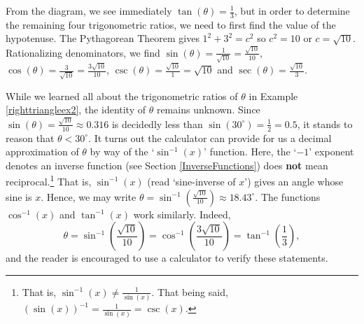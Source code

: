 \documentclass{ximera}
\begin{document}
\begin{example}
\begin{explanation}
\begin{image}
\end{image}

From the diagram, we see immediately $\tan(\theta) = \frac{1}{3}$, but in order to determine the remaining four trigonometric ratios, we need to first find the value of the hypotenuse. The Pythagorean Theorem gives $1^2 + 3^2 = c^2$ so $c^2 = 10$ or $c = \sqrt{10}$.   Rationalizing denominators, we find $\sin(\theta) = \frac{1}{\sqrt{10}} = \frac{\sqrt{10}}{10}$, $\cos(\theta) = \frac{3}{\sqrt{10}} = \frac{3\sqrt{10}}{10}$, $\csc(\theta) = \frac{\sqrt{10}}{1} = \sqrt{10}$ and $\sec(\theta) = \frac{\sqrt{10}}{3}$.  

\end{explanation}
\end{example}

While we learned all about the trigonometric ratios of $\theta$ in Example \ref{righttriangleex2}, the identity of $\theta$ remains unknown.  Since $\sin(\theta) = \frac{\sqrt{10}}{10} \approx 0.316 $ is decidedly less than $\sin\left(30^{\circ}\right) = \frac{1}{2} = 0.5$, it stands to reason that $\theta < 30^{\circ}$. It turns out the calculator can provide for us a decimal approximation of $\theta$ by way of the `$\sin^{-1}(x)$' function.  Here, the `$-1$' exponent denotes an inverse function (see Section \ref{InverseFunctions}) does \textbf{not} mean reciprocal.\footnote{That is, $\sin^{-1}(x) \neq \frac{1}{\sin(x)} $.  That being said, $(\sin(x))^{-1} = \frac{1}{\sin(x)} = \csc(x)$.}  That is, $\sin^{-1}(x)$ (read `sine-inverse of $x$') gives an angle whose sine is $x$.  Hence, we may write $\theta = \sin^{-1}\left(\frac{\sqrt{10}}{10}\right) \approx 18.43^{\circ}$.  The functions $\cos^{-1}(x)$ and $\tan^{-1}(x)$ work similarly.  Indeed, \[ \theta = \sin^{-1}\left(\frac{\sqrt{10}}{10}\right)  = \cos^{-1}\left(\frac{3 \sqrt{10}}{10}\right)  = \tan^{-1} \left( \frac{1}{3} \right),\] and the reader is encouraged to use a calculator to verify these statements.
\end{document}
